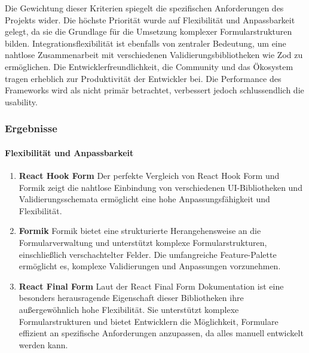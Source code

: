 Die Gewichtung dieser Kriterien spiegelt die spezifischen Anforderungen des Projekts wider. Die höchste Priorität wurde auf Flexibilität und Anpassbarkeit gelegt, da sie die Grundlage für die Umsetzung komplexer Formularstrukturen bilden. Integrationsflexibilität ist ebenfalls von zentraler Bedeutung, um eine nahtlose Zusammenarbeit mit verschiedenen Validierungsbibliotheken wie Zod zu ermöglichen. Die Entwicklerfreundlichkeit, die Community und das Ökosystem tragen erheblich zur Produktivität der Entwickler bei. Die Performance des Frameworks wird als nicht primär betrachtet, verbessert jedoch schlussendlich die \gls{usability}. \cite{prompt17_pollak}

\subsubsection{Ergebnisse}
\paragraph{Flexibilität und Anpassbarkeit}
\begin{enumerate}
	\item \textbf{React Hook Form} Der perfekte Vergleich von React Hook Form und Formik\cite{reactHookFormVsFormik} zeigt die nahtlose Einbindung von verschiedenen UI-Bibliotheken und Validierungsschemata ermöglicht eine hohe Anpassungsfähigkeit und Flexibilität.
	
	\item \textbf{Formik} Formik bietet eine strukturierte Herangehensweise an die Formularverwaltung und unterstützt komplexe Formularstrukturen, einschließlich verschachtelter Felder. Die umfangreiche Feature-Palette ermöglicht es, komplexe Validierungen und Anpassungen vorzunehmen.
	
	\item \textbf{React Final Form} Laut der React Final Form Dokumentation\cite{reactFinalFormLogrocket} ist eine besonders herausragende Eigenschaft dieser Bibliotheken ihre außergewöhnlich hohe Flexibilität. Sie unterstützt komplexe Formularstrukturen und bietet Entwicklern die Möglichkeit, Formulare effizient an spezifische Anforderungen anzupassen, da alles manuell entwickelt werden kann. 
\end{enumerate}

